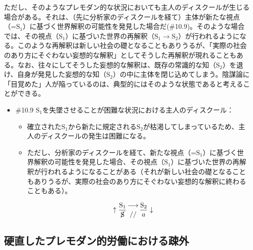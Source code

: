 ただし、そのようなプレモダン的な状況においても\mbox{主人のディスクール}が生じる場合がある。それは、（先に\mbox{分析家のディスクール}を経て）主体が新たな視点（=\(\textrm{S}_1\)）に基づく世界解釈の可能性を発見した場合だ(\#10.9)。そのような場合では、その視点（\(\textrm{S}_1\)）に基づいた世界の再解釈（\(\textrm{S}_1\rightarrow\textrm{S}_2\)）が行われるようになる。このような再解釈は新しい社会の礎となることもありうるが、「実際の社会のあり方にそぐわない妄想的な解釈」としてそうした再解釈が現れることもある。なお、往々にしてそうした妄想的な解釈は、既存の常識的な知（\(\textrm{S}_2\)）を退け、自身が発見した妄想的な知（\(\textrm{S}_2\)）の中に主体を閉じ込めてしまう。陰謀論に「目覚めた」人が陥っているのは、典型的にはそのような状態であると考えることができる。

\begin{note}{}
  \begin{itemize}
    \tightlist
    \item{\#10.9}
      $\textrm{S}_1$を失墜させることが困難な状況における\mbox{主人のディスクール}：
      \begin{itemize}
          \tightlist
          \item
          確立された$\textrm{S}_1$から新たに規定される$\textrm{S}_2$が枯渇してしまっているため、\mbox{主人のディスクール}の発生は困難になる。
          \item
          ただし、\mbox{分析家のディスクール}を経て、新たな視点（=$\textrm{S}_1$）に基づく世界解釈の可能性を発見した場合、その視点（$\textrm{S}_1$）に基づいた世界の再解釈が行われるようになることがある（それが新しい社会の礎となることもありうるが、実際の社会のあり方にそぐわない妄想的な解釈に終わることもある）。
        \end{itemize}

$$
\uparrow\frac{\mathrm{S_1}}{\cancel{\textrm{S}}}\genfrac{}{}{0pt}{}{\longrightarrow}{//}\frac{\mathrm{S_2}}{a}\downarrow
$$
  \end{itemize}
\end{note}

\subsection{硬直したプレモダン的労働における疎外}\label{ux786cux76f4ux3057ux305fux30d7ux30ecux30e2ux30c0ux30f3ux7684ux52b4ux50cdux306bux304aux3051ux308bux758eux5916}

